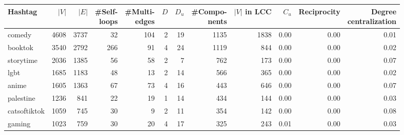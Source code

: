 \begin{tabular}{lrrrrrrrrrrr}
\toprule
         Hashtag &  $|V|$ &  $|E|$ &  \makecell{\#Self-\\ loops} &  \makecell{\#Multi-\\ edges} &  $D$ &  $D_u$ &  \makecell{\#Compo-\\nents} &  \makecell{$|V|$\\ in LCC} &  $C_u$ &  Reciprocity &  \makecell{Degree\\ centralization} \\
\midrule
          comedy &   4608 &   3737 &                          32 &                          104 &    2 &     19 &          1135 &                       1838 &   0.00 &         0.00 &                                0.01 \\
         booktok &   3540 &   2792 &                         266 &                           91 &    4 &     24 &          1119 &                        844 &   0.00 &         0.00 &                                0.02 \\
       storytime &   2036 &   1385 &                          56 &                           58 &    2 &      7 &           762 &                        173 &   0.00 &         0.00 &                                0.07 \\
            lgbt &   1685 &   1183 &                          48 &                           13 &    2 &     14 &           566 &                        365 &   0.00 &         0.00 &                                0.02 \\
           anime &   1605 &   1363 &                          67 &                           73 &    4 &     16 &           443 &                        646 &   0.00 &         0.00 &                                0.07 \\
       palestine &   1236 &    841 &                          22 &                           19 &    1 &     14 &           434 &                        144 &   0.00 &         0.00 &                                0.03 \\
    catsoftiktok &   1059 &    745 &                          30 &                            9 &    2 &     11 &           354 &                        142 &   0.00 &         0.00 &                                0.08 \\
          gaming &   1023 &    759 &                          30 &                           20 &    4 &     17 &           325 &                        243 &   0.01 &         0.00 &                                0.03 \\

\end{tabular}
